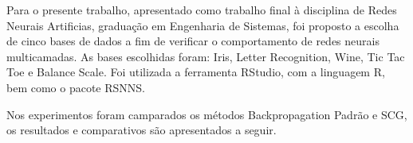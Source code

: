 Para o presente trabalho, apresentado como trabalho final à disciplina de Redes Neurais Artificias, graduação em Engenharia de Sistemas, foi proposto a escolha de cinco bases de dados a fim de verificar o comportamento de redes neurais multicamadas. As bases escolhidas foram: Iris, Letter Recognition, Wine, Tic Tac Toe e Balance Scale. Foi utilizada a ferramenta RStudio, com a linguagem R, bem como o pacote RSNNS.

Nos experimentos foram camparados os métodos Backpropagation Padrão e SCG, os resultados e comparativos são apresentados a seguir.